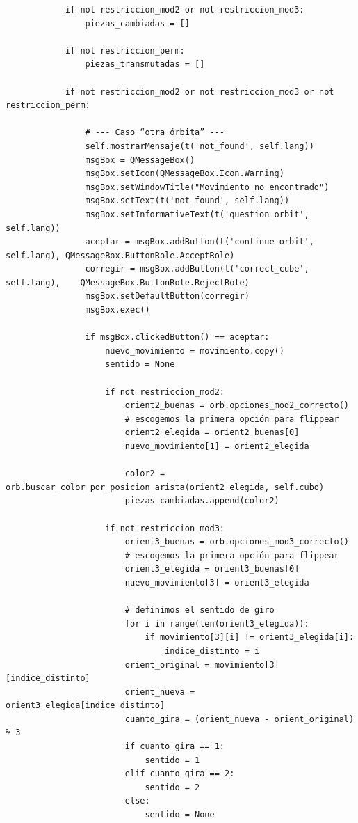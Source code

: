 \begin{lstlisting}
            if not restriccion_mod2 or not restriccion_mod3:
                piezas_cambiadas = []
            
            if not restriccion_perm:
                piezas_transmutadas = []
            
            if not restriccion_mod2 or not restriccion_mod3 or not restriccion_perm:
                
                # --- Caso “otra órbita” ---
                self.mostrarMensaje(t('not_found', self.lang))
                msgBox = QMessageBox()
                msgBox.setIcon(QMessageBox.Icon.Warning)
                msgBox.setWindowTitle("Movimiento no encontrado")
                msgBox.setText(t('not_found', self.lang))
                msgBox.setInformativeText(t('question_orbit', self.lang))
                aceptar = msgBox.addButton(t('continue_orbit', self.lang), QMessageBox.ButtonRole.AcceptRole)
                corregir = msgBox.addButton(t('correct_cube', self.lang),    QMessageBox.ButtonRole.RejectRole)
                msgBox.setDefaultButton(corregir)
                msgBox.exec()
                
                if msgBox.clickedButton() == aceptar:
                    nuevo_movimiento = movimiento.copy()
                    sentido = None
                    
                    if not restriccion_mod2:
                        orient2_buenas = orb.opciones_mod2_correcto()
                        # escogemos la primera opción para flippear
                        orient2_elegida = orient2_buenas[0]  
                        nuevo_movimiento[1] = orient2_elegida
                        
                        color2 = orb.buscar_color_por_posicion_arista(orient2_elegida, self.cubo)
                        piezas_cambiadas.append(color2)
                        
                    if not restriccion_mod3:
                        orient3_buenas = orb.opciones_mod3_correcto()
                        # escogemos la primera opción para flippear
                        orient3_elegida = orient3_buenas[0]
                        nuevo_movimiento[3] = orient3_elegida
                        
                        # definimos el sentido de giro
                        for i in range(len(orient3_elegida)):
                            if movimiento[3][i] != orient3_elegida[i]:
                                indice_distinto = i
                        orient_original = movimiento[3][indice_distinto]
                        orient_nueva = orient3_elegida[indice_distinto]
                        cuanto_gira = (orient_nueva - orient_original) % 3
                        if cuanto_gira == 1:
                            sentido = 1
                        elif cuanto_gira == 2:
                            sentido = 2
                        else:
                            sentido = None
                        

\end{lstlisting}
